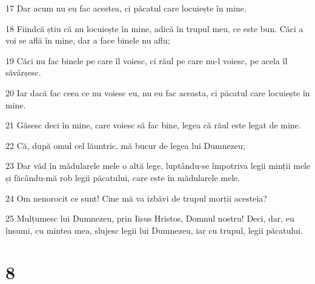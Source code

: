\par 17 Dar acum nu eu fac acestea, ci păcatul care locuiește în mine.
\par 18 Fiindcă știu că nu locuiește în mine, adică în trupul meu, ce este bun. Căci a voi se află în mine, dar a face binele nu aflu;
\par 19 Căci nu fac binele pe care îl voiesc, ci răul pe care nu-l voiesc, pe acela îl săvârșesc.
\par 20 Iar dacă fac ceea ce nu voiesc eu, nu eu fac aceasta, ci păcatul care locuiește în mine.
\par 21 Găsesc deci în mine, care voiesc să fac bine, legea că răul este legat de mine.
\par 22 Că, după omul cel lăuntric, mă bucur de legea lui Dumnezeu;
\par 23 Dar văd în mădularele mele o altă lege, luptându-se împotriva legii minții mele și făcându-mă rob legii păcatului, care este în mădularele mele.
\par 24 Om nenorocit ce sunt! Cine mă va izbăvi de trupul morții acesteia?
\par 25 Mulțumesc lui Dumnezeu, prin Iisus Hristos, Domnul nostru! Deci, dar, eu însumi, cu mintea mea, slujesc legii lui Dumnezeu, iar cu trupul, legii păcatului.

\chapter{8}

